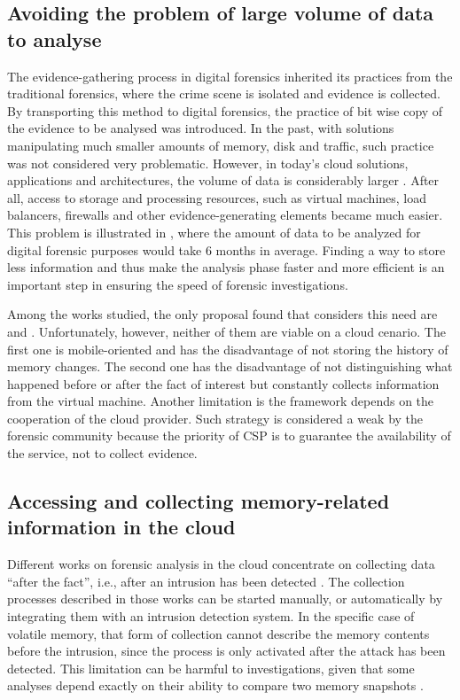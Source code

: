 \documentclass[conference]{IEEEtran}
\begin{document}
\subsection{Avoiding the problem of large volume of data to analyse}


The evidence-gathering process in digital forensics inherited its practices from the traditional forensics, where the crime scene is isolated and evidence is collected.
%
By transporting this method to digital forensics, the practice of bit wise copy of the evidence to be analysed was introduced. 
%
In the past, with solutions manipulating much smaller amounts of memory, disk and traffic, such practice was not considered very problematic. 
%
However, in today's cloud solutions, applications and architectures, the volume of data is considerably larger \cite{Quick_Increase_Volume_Impact:2014}. 
%
After all, access to storage and processing resources, such as virtual machines, load balancers, firewalls and other evidence-generating elements became much easier. 
%
This problem is illustrated in \cite{Quick_Increase_Volume_Impact:2014}, where the amount of data to be analyzed for digital forensic purposes would take 6 months in average. 
%
Finding a way to store less information and thus make the analysis phase faster and more efficient is an important step in ensuring the speed of forensic investigations.


Among the works studied, the only proposal found that considers this need are \cite{Dezfouli_Backup_approach:2012} and \cite{Sang_Log_approach:2013}. 
%
Unfortunately, however, neither of them are viable on a cloud cenario.
%
The first one is mobile-oriented and has the disadvantage of not storing the history of memory changes. 
%
The second one has the disadvantage of not distinguishing what happened before or after the fact of interest but constantly collects information from the virtual machine. 
%
Another limitation is the framework depends on the cooperation of the cloud provider. Such strategy is considered a weak by the forensic community because the priority of CSP is to guarantee the availability of the service, not to collect evidence.



\subsection{Accessing and collecting memory-related information in the cloud}


Different works on forensic analysis in the cloud concentrate on collecting data “after the fact”, i.e., after an intrusion has been detected \cite{Reichert_Auto_acquisition:2015,Poisel_VMI:2013,Dykstra_FROST:2013,George_DF2CE:2012,Sang_Log_approach:2013}. 
%
The collection processes described in those works can be started manually, or automatically by integrating them with an intrusion detection system. 
%
In the specific case of volatile memory, that form of collection cannot describe the memory contents before the intrusion, since the process is only activated after the attack has been detected.
%
This limitation can be harmful to investigations, given that some analyses depend exactly on their ability to compare two memory snapshots \cite{Case_Memory_Forensics:2014}. 
\end{document}
